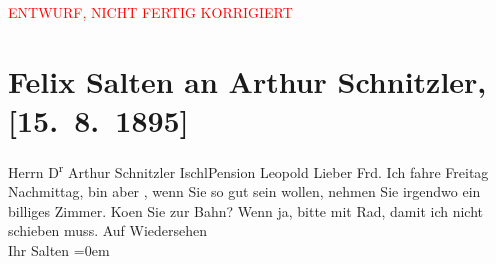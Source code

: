 
\begin{center}
            \textcolor{red}{ENTWURF, NICHT FERTIG KORRIGIERT}
                      \end{center}
            
         \renewcommand{\erwaehnteOrte}{Orte: Bad Ischl, Hotel und Pension Rudolfshöhe (Leopold Petter), I., Innere Stadt, Wien}
         \renewcommand{\erwaehnteWerke}{}
               \section[Felix Salten an Arthur Schnitzler, {[}15. 8. 1895{]}]{ Felix Salten an Arthur Schnitzler, {[}15. 8. 1895{]}}\nopagebreak{}\rehead{ }\begin{ledgroupsized}[t]{13cm}\normalsize\beginnumbering \toendnotes[C]{\smallbreak\pagebreak[2]} 
\toendnotes[C]{\smallbreak}\pstart{}{\pb}Herrn D\textsuperscript{r} Arthur Schnitzler \pend{}\pstart{}Ischl\pend{}\pstart{}Pension Leopold\pend{}{\bigskip}\pstart
           \noindent{}{\pb}Lieber Frd. Ich fahre Freitag{ }Nachmittag, bin aber \label{K_L03163-1v}\label{K_L03163-1h}, wenn Sie so gut sein wollen, nehmen Sie irgendwo ein billiges Zimmer. Ko{\geminationm}en Sie zur Bahn? Wenn ja, bitte mit Rad, damit ich
               nicht schieben muss. \pend
           \pstart
           Auf Wiedersehen {\\[\baselineskip]}Ihr \spacefill\mbox{Salten}\pend
           \leftskip=0em{}
         
         \endnumbering{}\end{ledgroupsized}\begin{anhang}\end{anhang}\newcommand{\dateiname}{L03163}\newcommand{\titel}{Felix Salten an Arthur Schnitzler, [15. 8. 1895]}\newcommand{\editorInnen}{Martin Anton Müller und Laura Untner}
      